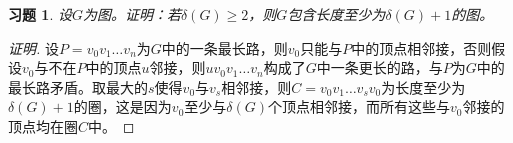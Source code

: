 \documentclass{article}
\begin{document}
\begin{CJK}{UTF8}{gbsn}
\newtheorem*{Exercise}{习题}
  \begin{Exercise}
  设$G$为图。证明：若$\delta(G)\geq 2$，则$G$包含长度至少为$\delta(G)+1$的图。  
  \end{Exercise}
  \begin{proof}[证明]
    设$P=v_0v_1\ldots v_n$为$G$中的一条最长路，则$v_0$只能与$P$中的顶点相邻接，否则假设$v_0$与不在$P$中的顶点$u$邻接，则$uv_0v_1\ldots v_n$构成了$G$中一条更长的路，与$P$为$G$中的最长路矛盾。取最大的$s$使得$v_0$与$v_s$相邻接，则$C=v_0v_1\ldots v_sv_0$为长度至少为$\delta(G)+1$的圈，这是因为$v_0$至少与$\delta(G)$个顶点相邻接，而所有这些与$v_0$邻接的顶点均在圈$C$中。
  \end{proof}
\end{CJK}
\end{document}
